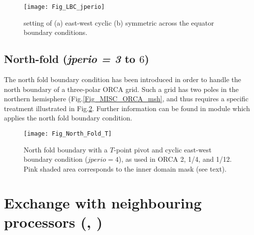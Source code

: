 \documentclass[NEMO_book]{subfiles}
\begin{document}
\begin{figure}[!t]     \begin{center}
\texttt{[image: Fig\_LBC\_jperio]}
\caption{    \label{Fig_LBC_jperio}
setting of (a) east-west cyclic  (b) symmetric across the equator boundary conditions.}
\end{center}   \end{figure}

\subsection{North-fold (\textit{jperio = 3 }to $6$) }
\label{LBC_north_fold}

The north fold boundary condition has been introduced in order to handle the north 
boundary of a three-polar ORCA grid. Such a grid has two poles in the northern hemisphere 
(Fig.\ref{Fig_MISC_ORCA_msh}, and thus requires a specific treatment illustrated in Fig.\ref{Fig_North_Fold_T}. 
Further information can be found in  module which applies the north fold boundary condition.

\begin{figure}[!t]    \begin{center}
\texttt{[image: Fig\_North\_Fold\_T]}
\caption{    \label{Fig_North_Fold_T} 
North fold boundary with a $T$-point pivot and cyclic east-west boundary condition 
($jperio=4$), as used in ORCA 2, 1/4, and 1/12. Pink shaded area corresponds 
to the inner domain mask (see text). }
\end{center}   \end{figure}

\section  [Exchange with neighbouring processors (\textit{lbclnk}, \textit{lib\_mpp})]
		{Exchange with neighbouring processors (, )}
\label{LBC_mpp}
\end{document}
